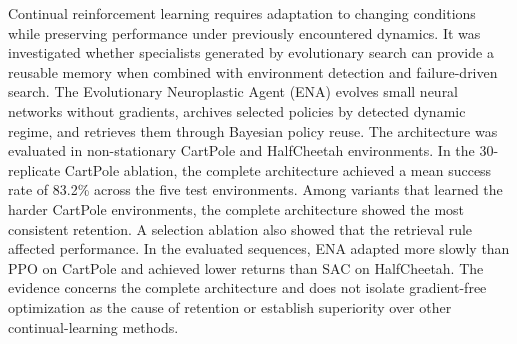 Continual reinforcement learning requires adaptation to changing conditions while preserving performance under previously encountered dynamics. It was investigated whether specialists generated by evolutionary search can provide a reusable memory when combined with environment detection and failure-driven search. The Evolutionary Neuroplastic Agent (ENA) evolves small neural networks without gradients, archives selected policies by detected dynamic regime, and retrieves them through Bayesian policy reuse. The architecture was evaluated in non-stationary CartPole and HalfCheetah environments. In the 30-replicate CartPole ablation, the complete architecture achieved a mean success rate of 83.2\% across the five test environments. Among variants that learned the harder CartPole environments, the complete architecture showed the most consistent retention. A selection ablation also showed that the retrieval rule affected performance. In the evaluated sequences, ENA adapted more slowly than PPO on CartPole and achieved lower returns than SAC on HalfCheetah. The evidence concerns the complete architecture and does not isolate gradient-free optimization as the cause of retention or establish superiority over other continual-learning methods.
